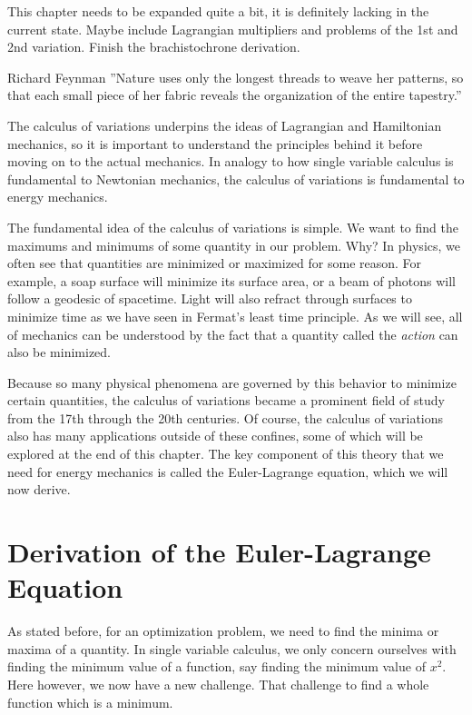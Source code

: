 \color{red} This chapter needs to be expanded quite a bit, it is definitely lacking in the current state. Maybe include Lagrangian multipliers and problems of the 1st and 2nd variation. Finish the brachistochrone derivation. 
\color{black}

\begin{chapquote}{Richard Feynman}
 ''Nature uses only the longest threads to weave her patterns, so that each small piece of her fabric reveals the organization of the entire tapestry.''
\end{chapquote}

The calculus of variations underpins the ideas of \gls{Lagrangian} and \gls{Hamiltonian} mechanics, so it is important to understand the principles behind it before moving on to the actual mechanics. In analogy to how single variable calculus is fundamental to Newtonian mechanics, the calculus of variations is fundamental to energy mechanics.

The fundamental idea of the calculus of variations is simple. We want to find the maximums and minimums of some quantity in our problem. Why? In physics, we often see that quantities are minimized or maximized for some reason. For example, a soap surface will minimize its surface area, or a beam of photons will follow a \gls{geodesic} of spacetime. Light will also refract through surfaces to minimize time as we have seen in Fermat's least time principle. As we will see, all of mechanics can be understood by the fact that a quantity called the \textit{action} can also be minimized.

Because so many physical phenomena are governed by this behavior to minimize certain quantities, the calculus of variations became a prominent field of study from the 17th through the 20th centuries. Of course, the calculus of variations also has many applications outside of these confines, some of which will be explored at the end of this chapter. The key component of this theory that we need for energy mechanics is called the Euler-Lagrange equation, which we will now derive.

\section{Derivation of the Euler-Lagrange Equation}

As stated before, for an optimization problem, we need to find the minima or maxima of a quantity. In single variable calculus, we only concern ourselves with finding the minimum value of a function, say finding the minimum value of $x^2$. Here however, we now have a new challenge. That challenge to find a whole function which is a minimum.

